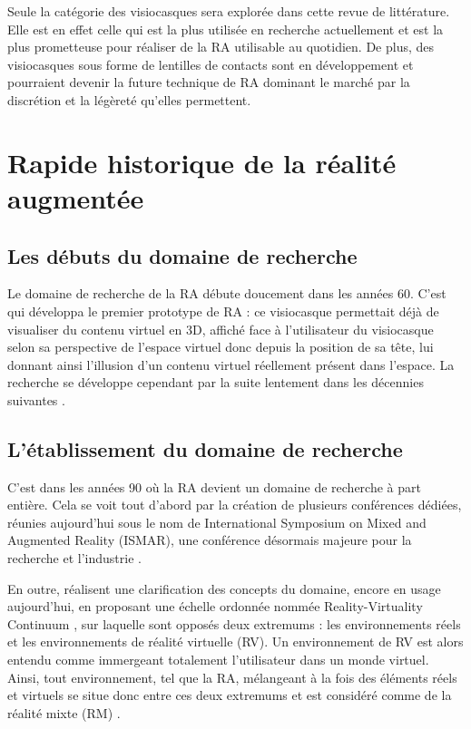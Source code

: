 
Seule la catégorie des visiocasques sera explorée dans cette revue de littérature. Elle est en effet celle qui est la plus utilisée en recherche actuellement et est la plus prometteuse pour réaliser de la RA utilisable au quotidien. \cite{CarmignianiFurhtAnisettiEtAl2011} De plus, des visiocasques sous forme de lentilles de contacts sont en développement et pourraient devenir la future technique de RA dominant le marché par la discrétion et la légèreté qu'elles permettent. \citep{VanKrevelenPoelman2010}


\section{Rapide historique de la réalité augmentée}
\subsection{Les débuts du domaine de recherche}

Le domaine de recherche de la RA débute doucement dans les années 60. C'est \citet{Sutherland1968} qui développa le premier prototype de RA : ce visiocasque permettait déjà de visualiser du contenu virtuel en 3D, affiché face à l'utilisateur du visiocasque selon sa perspective de l'espace virtuel donc depuis la position de sa tête, lui donnant ainsi l'illusion d'un contenu virtuel réellement présent dans l'espace. La recherche se développe cependant par la suite lentement dans les décennies suivantes \citep{VanKrevelenPoelman2010} \citep{CarmignianiFurhtAnisettiEtAl2011}.

\subsection{L'établissement du domaine de recherche}
C'est dans les années 90 où la RA devient un domaine de recherche à part entière. Cela se voit tout d'abord par la création de plusieurs conférences dédiées, réunies aujourd'hui sous le nom de International Symposium on Mixed and Augmented Reality (ISMAR), une conférence désormais majeure pour la recherche et l'industrie \citep{AzumaBaillotBehringerEtAl2001}.

En outre, \citet{MilgramKishino1994} réalisent une clarification des concepts du domaine, encore en usage aujourd'hui, en proposant une échelle ordonnée nommée \foreignlanguage{english}{Reality-Virtuality Continuum} , sur laquelle sont opposés deux extremums : les environnements réels et les environnements de réalité virtuelle (RV). Un environnement de RV est alors entendu comme immergeant totalement l'utilisateur dans un monde virtuel. Ainsi, tout environnement, tel que la RA, mélangeant à la fois des éléments réels et virtuels se situe donc entre ces deux extremums et est considéré comme de la réalité mixte (RM) \citep{MilgramKishino1994}.

